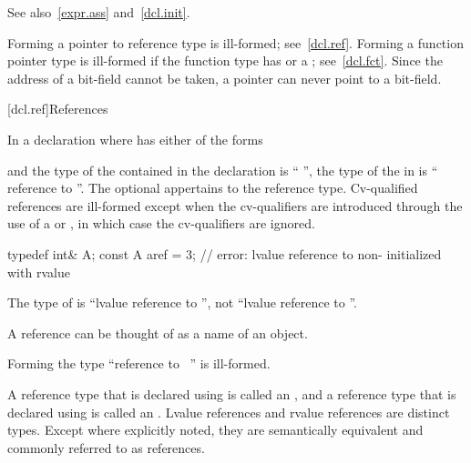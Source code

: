 \pnum
See also~\ref{expr.ass} and~\ref{dcl.init}.

\pnum
\begin{note}
Forming a pointer to reference type is ill-formed; see~\ref{dcl.ref}.
Forming a function pointer type is ill-formed if the function type has
 or a ;
see~\ref{dcl.fct}.
Since the address of a bit-field cannot be taken,
a pointer can never point to a bit-field.
\end{note}

[dcl.ref]{References}%

\pnum
In a declaration
where
has either of the forms
\begin{ncsimplebnf}
\terminal{\&}  \br
\terminal{\&\&}  
\end{ncsimplebnf}
and the type of the contained  in the declaration
is ``
'',
the type of the  in
is `` reference to
''.
The optional  appertains to the reference type.
Cv-qualified references are ill-formed except when the cv-qualifiers
are introduced through the use of a
 or
,
in which case the cv-qualifiers are ignored.
\begin{example}
\begin{codeblock}
typedef int& A;
const A aref = 3;   // error: lvalue reference to non- initialized with rvalue
\end{codeblock}

The type of
is ``lvalue reference to '',
not ``lvalue reference to ''.
\end{example}
\begin{note}
A reference can be thought of as a name of an object.
\end{note}
%
Forming the type
``reference to \cv{}~''
is ill-formed.


\pnum
A reference type that is declared using \tcode{\&} is called an
, and a reference type that
is declared using \tcode{\&\&} is called an
. Lvalue references and
rvalue references are distinct types. Except where explicitly noted, they are
semantically equivalent and commonly referred to as references.

